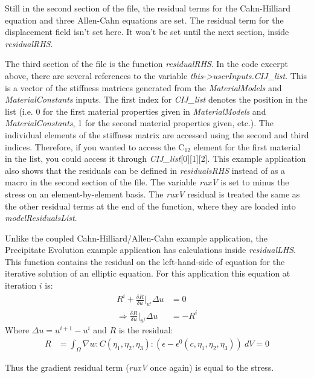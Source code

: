 \documentclass[10pt]{article} %
\begin{document}
Still in the second section of the file, the residual terms for the Cahn-Hilliard equation and three Allen-Cahn equations are set. The residual term for the displacement field isn't set here. It won't be set until the next section, inside \emph{residualRHS}.

The third section of the file is the function \emph{residualRHS}. In the code excerpt above, there are several references to the variable \emph{this->userInputs.CIJ\_list}. This is a vector of the stiffness matrices generated from the \emph{MaterialModels} and \emph{MaterialConstants} inputs. The first index for \emph{CIJ\_list} denotes the position in the list (i.e. 0 for the first material properties given in \emph{MaterialModels} and \emph{MaterialConstants}, 1 for the second material properties given, etc.). The individual elements of the stiffness matrix are accessed using the second and third indices. Therefore, if you wanted to access the C$_{12}$ element for the first material in the list, you could access it through \emph{CIJ\_list}[0][1][2]. This example application also shows that the residuals can be defined in \emph{residualsRHS} instead of as a macro in the second section of the file. The variable \emph{ruxV} is set to minus the stress on an element-by-element basis. The \emph{ruxV} residual is treated the same as the other residual terms at the end of the function, where they are loaded into \emph{modelResidualsList}.

Unlike the coupled Cahn-Hilliard/Allen-Cahn example application, the Precipitate Evolution example application has calculations inside \emph{residualLHS}.  This function contains the residual on the left-hand-side of equation for the iterative solution of an elliptic equation. For this application this equation at iteration $i$ is: 
\begin{align}
R^i + \frac{\delta R}{\delta u} \bigg|_{u^i} \Delta u &= 0 \\
\Rightarrow \frac{\delta R}{\delta u}\bigg|_{u^i} \Delta u &= -R^i
\end{align}
Where $\Delta u = u^{i+1}-u^i$ and $R$ is the residual:
\begin{align}
R &=  \int_{\Omega}   \nabla w :  C(\eta_1, \eta_2, \eta_3) : \left( \epsilon - \epsilon^0(c,\eta_1, \eta_2, \eta_3)\right) ~dV = 0 
\end{align}

Thus the gradient residual term (\emph{ruxV} once again) is equal to the stress.
\end{document}
